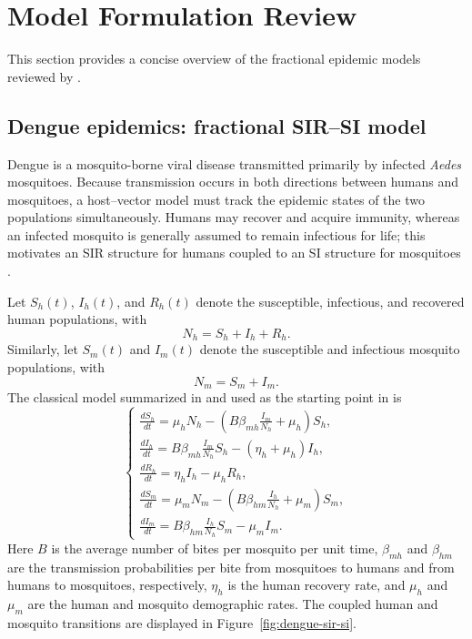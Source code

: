 \documentclass[00-main.tex]{subfiles}
\begin{document}
\section{Model Formulation Review}

This section provides a concise overview of the fractional epidemic models reviewed by \cite{Ch21}.


\subsection{Dengue epidemics: fractional SIR--SI model}

Dengue is a mosquito-borne viral disease transmitted primarily by infected \textit{Aedes} mosquitoes.
Because transmission occurs in both directions between humans and mosquitoes, a host--vector model must track the epidemic states of the two populations simultaneously.
Humans may recover and acquire immunity, whereas an infected mosquito is generally assumed to remain infectious for life; this motivates an SIR structure for humans coupled to an SI structure for mosquitoes \cite{WHO09}.

Let $S_h(t)$, $I_h(t)$, and $R_h(t)$ denote the susceptible, infectious, and recovered human populations, with
\[
    N_h=S_h+I_h+R_h.
\]
Similarly, let $S_m(t)$ and $I_m(t)$ denote the susceptible and infectious mosquito populations, with
\[ N_m=S_m+I_m. \]
The classical model summarized in \cite{Ch21} and used as the starting point in \cite{PRT11} is
\[
\begin{cases}
    \displaystyle
    \frac{dS_h}{dt}
    =\mu_hN_h-
      \left(B\beta_{mh}\frac{I_m}{N_h}+\mu_h\right)S_h, \\[8pt]
    \displaystyle
    \frac{dI_h}{dt}
    =B\beta_{mh}\frac{I_m}{N_h}S_h-(\eta_h+\mu_h)I_h, \\[8pt]
    \displaystyle
    \frac{dR_h}{dt}
    =\eta_hI_h-\mu_hR_h, \\[8pt]
    \displaystyle
    \frac{dS_m}{dt}
    =\mu_mN_m-
      \left(B\beta_{hm}\frac{I_h}{N_h}+\mu_m\right)S_m, \\[8pt]
    \displaystyle
    \frac{dI_m}{dt}
    =B\beta_{hm}\frac{I_h}{N_h}S_m-\mu_mI_m.
\end{cases}
\]
Here $B$ is the average number of bites per mosquito per unit time, $\beta_{mh}$ and $\beta_{hm}$ are the transmission probabilities per bite from mosquitoes to humans and from humans to mosquitoes, respectively, $\eta_h$ is the human recovery rate, and $\mu_h$ and $\mu_m$ are the human and mosquito demographic rates.
The coupled human and mosquito transitions are displayed in Figure~\ref{fig:dengue-sir-si}.
\end{document}
